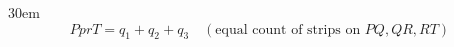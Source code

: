 \documentclass[border=4pt]{standalone}
\begin{document}
\begin{varwidth}{30em}
\large
\[ PprT = q_1 + q_2 + q_3 \quad (\text{equal count of strips on } PQ,QR,RT) \]

\end{varwidth}
\end{document}
